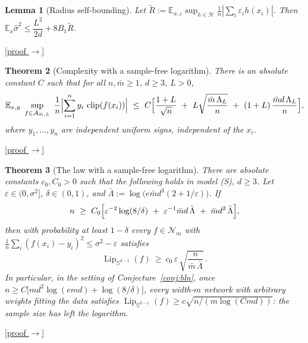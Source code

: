 \documentclass[11pt,reqno]{amsart}
\theoremstyle{plain}
\newtheorem{theorem}{Theorem}[section]
\newtheorem{lemma}[theorem]{Lemma}
\theoremstyle{definition}
\theoremstyle{remark}
\newcommand{\Sd}{\mathbb{S}^{d-1}}
\newcommand{\EE}{\mathbb{E}}
\newcommand{\eps}{\varepsilon}
\newcommand{\Lip}{\operatorname{Lip}}
\newcommand{\NN}{\mathcal{N}}
\newcommand{\AAA}{\mathcal{A}}
\DeclareMathOperator{\clip}{clip}
\newcommand{\proofbutton}[1]{\hyperref[proof:#1]{\textnormal{\footnotesize\textsf{[proof $\to$]}}}}
\begin{document}
\begin{lemma}[Radius self-bounding]\label{lem:selfbound}
Let $\widetilde R:=\EE_{x,\varepsilon}\sup_{h\in\mathcal H}\tfrac1n|\sum_i\varepsilon_ih(x_i)|$. Then $\EE_x\hat\sigma^2\le\dfrac{L^2}{2d}+8B_1\widetilde R$.
\end{lemma}
\proofbutton{selfbound}

\begin{theorem}[Complexity with a sample-free logarithm]\label{thm:sharpcomplexity}
There is an absolute constant $C$ such that for all $n,\bar m\ge1$, $d\ge3$, $L>0$,
\[
\EE_{x,y}\ \sup_{f\in\AAA_{\bar m,L}}\ \frac1n\Bigl|\sum_{i=1}^ny_i\,\clip(f(x_i))\Bigr|\ \le\ C\Bigl[\frac{1+L}{\sqrt n}\ +\ L\sqrt{\frac{\bar m\,\Lambda_L}{n}}\ +\ (1+L)\,\frac{\bar md\,\Lambda_L}{n}\Bigr],
\]
where $y_1,\dots,y_n$ are independent uniform signs, independent of the $x_i$.
\end{theorem}
\proofbutton{sharpcomplexity}

\begin{theorem}[The law with a sample-free logarithm]\label{thm:sharplog}
There are absolute constants $c_0,C_0>0$ such that the following holds in model (S), $d\ge3$. Let $\eps\in(0,\sigma^2]$, $\delta\in(0,1)$, and $\bar\Lambda:=\log\bigl(e\bar md^3(2+1/\eps)\bigr)$. If
\[
n\ \ge\ C_0\Bigl[\eps^{-2}\log(8/\delta)\ +\ \eps^{-1}\bar md\,\bar\Lambda\ +\ \bar md^2\,\bar\Lambda\Bigr],
\]
then with probability at least $1-\delta$ every $f\in\NN_m$ with $\frac1n\sum_i(f(x_i)-y_i)^2\le\sigma^2-\eps$ satisfies
\[
\Lip_{\Sd}(f)\ \ge\ c_0\,\eps\,\sqrt{\frac{n}{\bar m\,\bar\Lambda}}\,.
\]
In particular, in the setting of Conjecture~\ref{conj:bln}, once $n\ge C\bigl[md^2\log(emd)+\log(8/\delta)\bigr]$, every width-$m$ network with arbitrary weights fitting the data satisfies $\Lip_{\Sd}(f)\ge c\sqrt{n/(m\log(Cmd))}$: the sample size has left the logarithm.
\end{theorem}
\proofbutton{sharplog}
\end{document}
